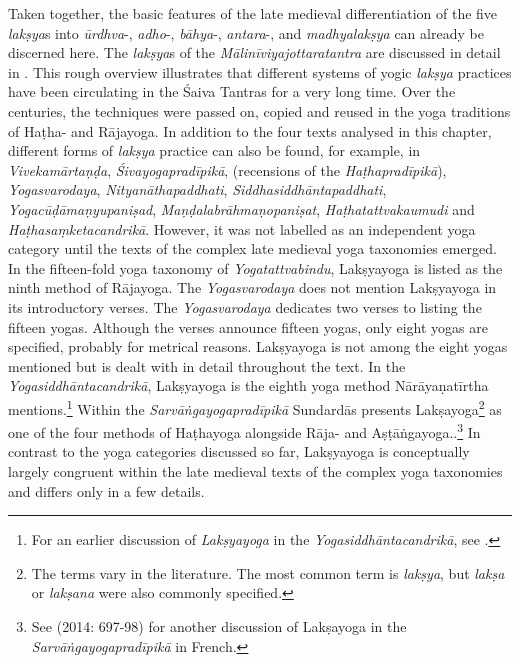 {Taken together, the basic features of the late medieval differentiation of the five \textit{lakṣya}s into \textit{ūrdhva}-, \textit{adho}-, \textit{bāhya}-, \textit{antara}-, and \textit{madhyalakṣya} can already be discerned here. The \textit{lakṣya}s of the \textit{Mālinīviyajottaratantra} are discussed in detail in \citeauthor[2004: 253-293]{vasudeva2004}. This rough overview illustrates that different systems of yogic \textit{lakṣya} practices have been circulating in the Śaiva Tantras for a very long time. Over the centuries, the techniques were passed on, copied and reused in the yoga traditions of Haṭha- and Rājayoga. In addition to the four texts analysed in this chapter, different forms of \textit{lakṣya} practice can also be found, for example, in \textit{Vivekamārtaṇḍa}, \textit{Śivayogapradīpikā}, (recensions of the \textit{Haṭhapradīpikā}), \textit{Yogasvarodaya}, \textit{Nityanāthapaddhati}, \textit{Siddhasiddhāntapaddhati}, \textit{Yogacūḍāmaṇyupaniṣad}, \textit{Maṇḍalabrāhmaṇopaniṣat}, \textit{Haṭhatattvakaumudi} and \textit{Haṭhasaṃketacandrikā}.\label{saivaparadigm}} However, it was not labelled as an independent yoga category until the texts of the complex late medieval yoga taxonomies emerged. In the fifteen-fold yoga taxonomy of \textit{Yogatattvabindu}, Lakṣyayoga is listed as the ninth method of Rājayoga. The \textit{Yogasvarodaya} does not mention Lakṣyayoga in its introductory verses. The \textit{Yogasvarodaya} dedicates two verses to listing the fifteen yogas. Although the verses announce fifteen yogas, only eight yogas are specified, probably for metrical reasons. Lakṣyayoga is not among the eight yogas mentioned but is dealt with in detail throughout the text. In the \textit{Yogasiddhāntacandrikā}, Lakṣyayoga is the eighth yoga method Nārāyaṇatīrtha mentions.\footnote{For an earlier discussion of \textit{Lakṣyayoga} in the \textit{Yogasiddhāntacandrikā}, see \citeauthor[2004: 77-78]{penna2004}.} Within the \textit{Sarvāṅgayogapradīpikā} Sundardās presents Lakṣayoga\footnote{The terms vary in the literature. The most common term is \textit{lakṣya}, but \textit{lakṣa} or \textit{lakṣana} were also commonly specified.} as one of the four methods of Haṭhayoga alongside Rāja- and Aṣṭāṅgayoga..\footnote{See \citeauthor{burger2014sarvangayogapradipika} (2014: 697-98) for another discussion of Lakṣayoga in the \textit{Sarvāṅgayogapradīpikā} in French.} In contrast to the yoga categories discussed so far, Lakṣyayoga is conceptually largely congruent within the late medieval texts of the complex yoga taxonomies and differs only in a few details.

